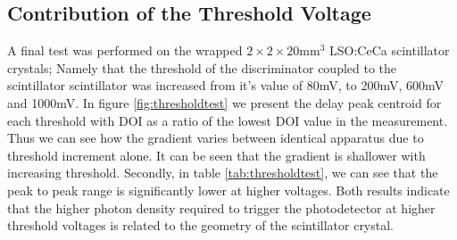 \subsection{Contribution of the Threshold Voltage}

A final test was performed on the wrapped $2\times2\times20$mm$^3$ LSO:CeCa scintillator crystals; Namely that the threshold of the discriminator coupled to the scintillator scintillator was increased from it's value of 80mV, to 200mV, 600mV and 1000mV. In figure \ref{fig:thresholdtest} we present the delay peak centroid for each threshold with DOI as a ratio of the lowest DOI value in the measurement. Thus we can see how the gradient varies between identical apparatus due to threshold increment alone. It can be seen that the gradient is shallower with increasing threshold. Secondly, in table \ref{tab:thresholdtest}, we can see that the peak to peak range is significantly lower at higher voltages. Both results indicate that the higher photon density required to trigger the photodetector at higher threshold voltages is related to the geometry of the scintillator crystal.

